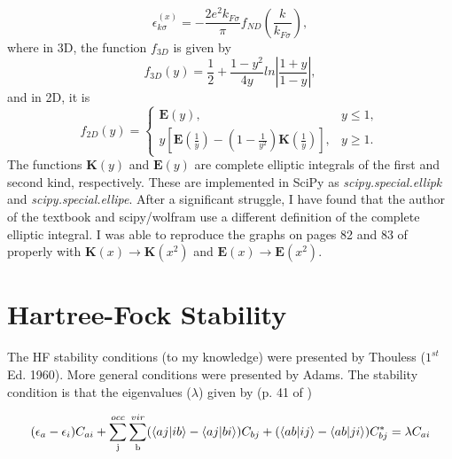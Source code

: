 \documentclass{revtex4}
\begin{document}
\begin{equation}\label{eq:hfexch}
\epsilon_{k\sigma}^{(x)} = -\frac{2e^2k_{F\sigma}}{\pi}f_{ND}\left(\frac{k}{k_{F\sigma}}\right),
\end{equation}
where in 3D, the function $f_{3D}$ is given by
\begin{equation}
f_{3D}\left(y\right) = \frac{1}{2} + \frac{1-y^2}{4y} ln \left|\frac{1+y}{1-y} \right|,
\end{equation}
and in 2D, it is
\begin{equation}\label{eq:fnd}
f_{2D}\left(y\right) = 
\begin{cases} 
    \mathbf{E}\left(y\right), &  y \leq 1, \\
    y 
    \left[ 
        \mathbf{E} 
        \left(
            \frac{1}{y} 
        \right)
        -
        \left(
            1 - \frac{1}{y^2}
        \right)
        \mathbf{K}
        \left(
            \frac{1}{y}
        \right)
       \right]  ,& y \geq 1. 
\end{cases}
\end{equation}
The functions $\mathbf{K}(y)$ and $ \mathbf{E}(y) $ are complete elliptic integrals of the first and second kind, respectively. These are implemented in SciPy as \emph{scipy.special.ellipk} and \emph{scipy.special.ellipe}. After a significant struggle, I have found that the author of the textbook\cite{Guiliani2005} and scipy/wolfram use a different definition of the complete elliptic integral. I was able to reproduce the graphs on pages 82 and 83 of \cite{Guiliani2005} properly with $\mathbf{K}(x) \rightarrow \mathbf{K}(x^2)$ and $\mathbf{E}(x) \rightarrow \mathbf{E}(x^2)$.

\section{Hartree-Fock Stability}
The HF stability conditions (to my knowledge) were presented by Thouless \cite{Thouless1972} ($1^{st}$ Ed. 1960). More general conditions were presented by Adams\cite{Adams1962}. The stability condition is that the eigenvalues ($\lambda$) given by (p. 41 of \cite{Thouless1972}) 

\begin{equation}
(\epsilon_a-\epsilon_i)C_{ai} + \sum\limits_{\text{j}}^{occ}\sum\limits_{\text{b}}^{vir}
	(\braket{aj|ib}-\braket{aj|bi})C_{bj}
	+(\braket{ab|ij}-\braket{ab|ji})C_{bj}^*
	=\lambda C_{ai}
\end{equation}
\end{document}
